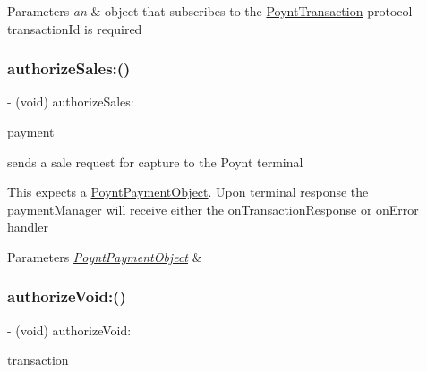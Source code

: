 \begin{DoxyParams}{Parameters}
{\em an} & object that subscribes to the \hyperlink{class_poynt_transaction-p}{Poynt\+Transaction} protocol -\/ transaction\+Id is required \\
\hline
\end{DoxyParams}
\hypertarget{interface_poynt_p_o_s_connection_manager_addc8717b201139753094f0d5d9038ea9}{}\label{interface_poynt_p_o_s_connection_manager_addc8717b201139753094f0d5d9038ea9} 
\subsubsection{\texorpdfstring{authorize\+Sales\+:()}{authorizeSales:()}}
{\footnotesize\ttfamily -\/ (void) authorize\+Sales\+: \begin{DoxyParamCaption}\item[{(\hyperlink{interface_poynt_payment_object}{Poynt\+Payment\+Object} $\ast$)}]{payment }\end{DoxyParamCaption}}



sends a sale request for capture to the Poynt terminal 

This expects a \hyperlink{interface_poynt_payment_object}{Poynt\+Payment\+Object}. Upon terminal response the payment\+Manager will receive either the on\+Transaction\+Response or on\+Error handler


\begin{DoxyParams}{Parameters}
{\em \hyperlink{interface_poynt_payment_object}{Poynt\+Payment\+Object}} & \\
\hline
\end{DoxyParams}
\hypertarget{interface_poynt_p_o_s_connection_manager_ac78262b676405ba3826f79c55c488e1f}{}\label{interface_poynt_p_o_s_connection_manager_ac78262b676405ba3826f79c55c488e1f} 
\subsubsection{\texorpdfstring{authorize\+Void\+:()}{authorizeVoid:()}}
{\footnotesize\ttfamily -\/ (void) authorize\+Void\+: \begin{DoxyParamCaption}\item[{(id$<$ Poynt\+Transaction $>$)}]{transaction }\end{DoxyParamCaption}}




